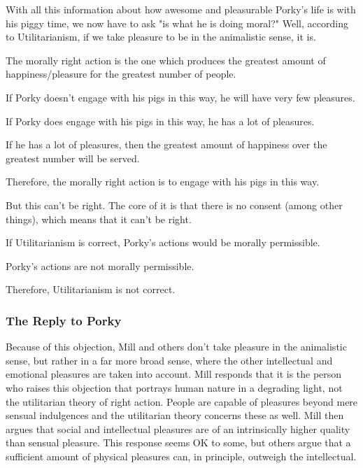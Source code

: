 With all this information about how awesome and pleasurable Porky's life is with his piggy time, we now have to ask "is what he is doing moral?" Well, according to Utilitarianism, if we take pleasure to be in the animalistic sense, it is.
\begin{earg}
    \item[]The morally right action is the one which produces the greatest amount of happiness/pleasure for the greatest number of people.
    \item[]If Porky doesn’t engage with his pigs in this way, he will have very few pleasures.
    \item[]If Porky does engage with his pigs in this way, he has a lot of pleasures.
    \item[]If he has a lot of pleasures, then the greatest amount of happiness over the greatest number will be served.
    \item[]Therefore, the morally right action is to engage with his pigs in this way.
\end{earg}
But this can't be right. The core of it is that there is no consent (among other things), which means that it can't be right.
\begin{earg}
    \item[]If Utilitarianism is correct, Porky’s actions would be morally permissible.
    \item[]Porky’s actions are not morally permissible.
    \item[]Therefore, Utilitarianism is not correct.
\end{earg}

\subsubsection{The Reply to Porky}

Because of this objection, Mill and others don't take pleasure in the animalistic sense, but rather in a far more broad sense, where the other intellectual and emotional pleasures are taken into account. Mill responds that it is the person who raises this objection that portrays human nature in a degrading light, not the utilitarian theory of right action. People are capable of pleasures beyond mere sensual indulgences and the utilitarian theory concerns these as well. Mill then argues that social and intellectual pleasures are of an intrinsically higher quality than sensual pleasure. This response seems OK to some, but others argue that a sufficient amount of physical pleasures can, in principle, outweigh the intellectual.

